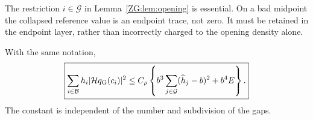 The restriction $i\in\mathcal G$ in Lemma~\ref{ZG:lem:opening} is
essential.  On a bad midpoint the collapsed reference value is an
endpoint trace, not zero.  It must be retained in the endpoint layer,
rather than incorrectly charged to the opening density alone.

\begin{lemma}\label{ZG:lem:gap-target}
With the same notation,
\begin{equation}\label{ZG:eq:gap-target}
 \boxed{
 \sum_{i\in\mathcal B}h_i|\mathcal H q_{\rm G}(c_i)|^2
 \le C_\rho\left\{
 b^3\sum_{j\in\mathcal G}(\widehat h_j-b)^2+b^4E\right\}.}
\end{equation}
The constant is independent of the number and subdivision of the gaps.
\end{lemma}

